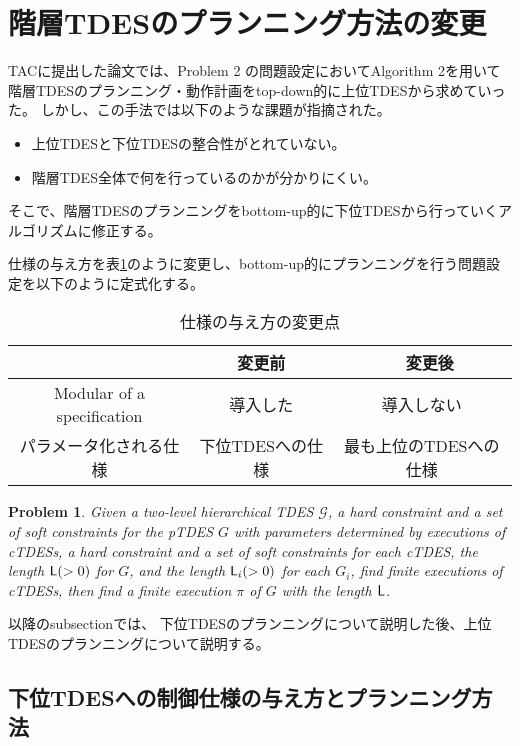 \documentclass[ 10pt]{jsarticle}
\newtheorem{pbm}{Problem}
\newcommand{\rsec}[1]{Section\,\ref{#1}}
\newcommand{\tick}{{\sf tick}}
\newcommand{\Len}{{\sf L}}
\begin{document}
%
\section{階層TDESのプランニング方法の変更}
TACに提出した論文では、Problem 2 の問題設定においてAlgorithm 2を用いて階層TDESのプランニング・動作計画をtop-down的に上位TDESから求めていった。
しかし、この手法では以下のような課題が指摘された。
\begin{itemize}
\item
上位TDESと下位TDESの整合性がとれていない。
\item
階層TDES全体で何を行っているのかが分かりにくい。
\end{itemize}
そこで、階層TDESのプランニングをbottom-up的に下位TDESから行っていくアルゴリズムに修正する。

仕様の与え方を表\ref{spec}のように変更し、bottom-up的にプランニングを行う問題設定を以下のように定式化する。
%
\begin{table}[tb]
\centering
\caption{仕様の与え方の変更点}
\label{spec}
\begin{tabular}{c||c|c}
 &変更前　&　変更後　\\\hline\hline
Modular of a specification&導入した&導入しない\\\hline
パラメータ化される仕様 &下位TDESへの仕様&最も上位のTDESへの仕様
\end{tabular}
\end{table}
%
\begin{pbm}\label{pbm3}
Given a two-level hierarchical TDES $\mathcal{G}$, a hard constraint and a set of soft constraints for the pTDES $G$ with parameters determined by executions of cTDESs, a  hard constraint and a set of soft constraints for each cTDES, the length $\Len(>0)$ for $G$, and the length $\Len_i(>0)$ for each $G_i$, find finite executions of cTDESs, then find a finite execution $\pi$ of $G$ with the length $\Len$.
%
\end{pbm}
%
以降のsubsectionでは、
下位TDESのプランニングについて説明した後、上位TDESのプランニングについて説明する。
%
\subsection{下位TDESへの制御仕様の与え方とプランニング方法}
%
%

\end{document}
